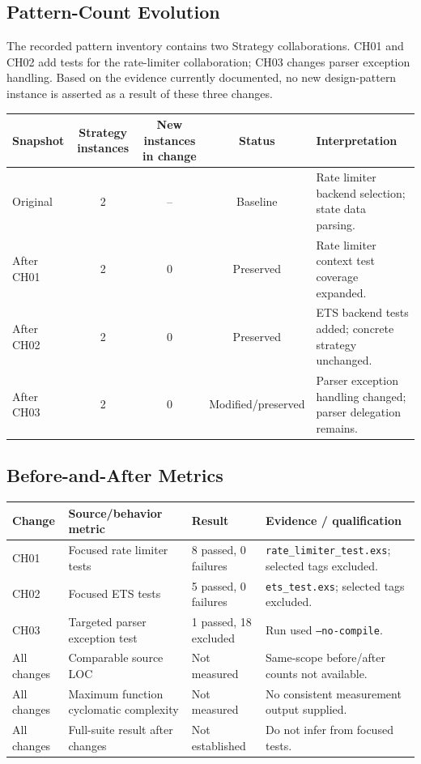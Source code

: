 \documentclass[11pt,a4paper]{article}
\newcommand{\code}[1]{\texttt{#1}}
\begin{document}
\subsection{Pattern-Count Evolution}
The recorded pattern inventory contains two Strategy collaborations. CH01 and CH02 add tests for the rate-limiter collaboration; CH03 changes parser exception handling. Based on the evidence currently documented, no new design-pattern instance is asserted as a result of these three changes.

\begin{center}
\begin{tabularx}{0.95\linewidth}{@{}lcccX@{}}
\toprule Snapshot & Strategy instances & New instances in change & Status & Interpretation\\ \midrule
Original & 2 & -- & Baseline & Rate limiter backend selection; state data parsing.\\
After CH01 & 2 & 0 & Preserved & Rate limiter context test coverage expanded.\\
After CH02 & 2 & 0 & Preserved & ETS backend tests added; concrete strategy unchanged.\\
After CH03 & 2 & 0 & Modified/preserved & Parser exception handling changed; parser delegation remains.\\
\bottomrule
\end{tabularx}
\end{center}


\subsection{Before-and-After Metrics}
\begin{center}
\begin{tabularx}{\linewidth}{@{}lXlX@{}}
\toprule Change & Source/behavior metric & Result & Evidence / qualification\\ \midrule
CH01 & Focused rate limiter tests & 8 passed, 0 failures & \code{rate\_limiter\_test.exs}; selected tags excluded.\\
CH02 & Focused ETS tests & 5 passed, 0 failures & \code{ets\_test.exs}; selected tags excluded.\\
CH03 & Targeted parser exception test & 1 passed, 18 excluded & Run used \code{--no-compile}.\\
All changes & Comparable source LOC & Not measured & Same-scope before/after counts not available.\\
All changes & Maximum function cyclomatic complexity & Not measured & No consistent measurement output supplied.\\
All changes & Full-suite result after changes & Not established & Do not infer from focused tests.\\
\bottomrule
\end{tabularx}
\end{center}
\end{document}
